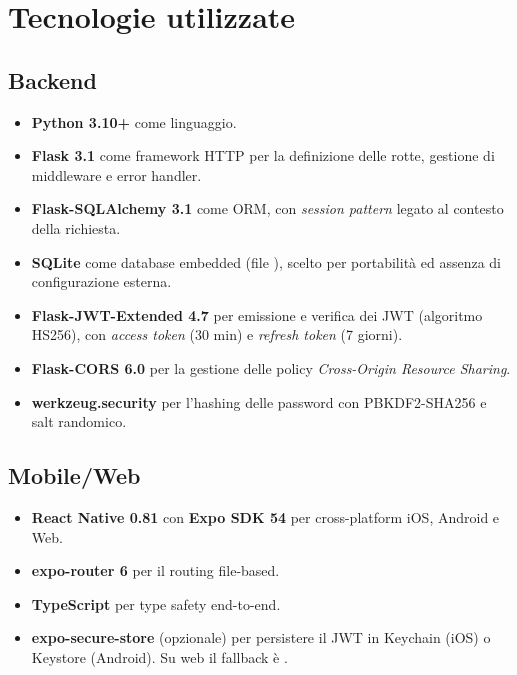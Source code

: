 \section{Tecnologie utilizzate}

\subsection{Backend}
\begin{itemize}
    \item \textbf{Python 3.10+} come linguaggio.
    \item \textbf{Flask 3.1} come framework HTTP per la definizione delle
    rotte, gestione di middleware e error handler.
    \item \textbf{Flask-SQLAlchemy 3.1} come ORM, con \emph{session pattern}
    legato al contesto della richiesta.
    \item \textbf{SQLite} come database embedded (file ),
    scelto per portabilità ed assenza di configurazione esterna.
    \item \textbf{Flask-JWT-Extended 4.7} per emissione e verifica dei JWT
    (algoritmo HS256), con \emph{access token} (30 min) e \emph{refresh token}
    (7 giorni).
    \item \textbf{Flask-CORS 6.0} per la gestione delle policy
    \emph{Cross-Origin Resource Sharing}.
    \item \textbf{werkzeug.security} per l'hashing delle password con
    PBKDF2-SHA256 e salt randomico.
\end{itemize}

\subsection{Mobile/Web}
\begin{itemize}
    \item \textbf{React Native 0.81} con \textbf{Expo SDK 54} per
    cross-platform iOS, Android e Web.
    \item \textbf{expo-router 6} per il routing file-based.
    \item \textbf{TypeScript} per type safety end-to-end.
    \item \textbf{expo-secure-store} (opzionale) per persistere il JWT in
    Keychain (iOS) o Keystore (Android). Su web il fallback è
    .
\end{itemize}

